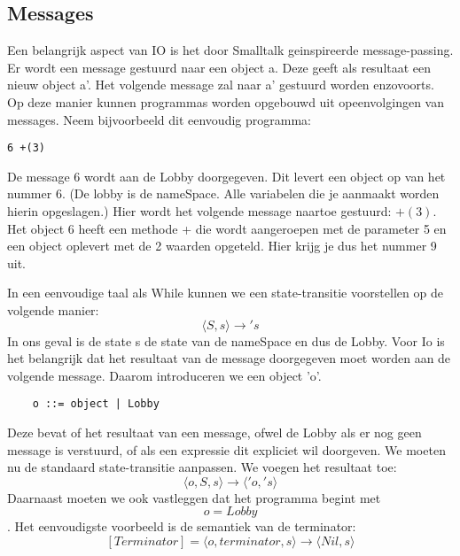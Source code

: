 \documentclass[12pt]{article}
\begin{document}
\subsection{Messages}
Een belangrijk aspect van IO is het door Smalltalk geinspireerde message-passing. Er wordt een message gestuurd naar een object a. Deze geeft als resultaat een nieuw object a'. Het volgende message zal naar a' gestuurd worden enzovoorts.  Op deze manier kunnen programmas worden opgebouwd uit opeenvolgingen van messages. Neem bijvoorbeeld dit eenvoudig programma:
\begin{lstlisting}[frame=single]
6 +(3)
\end{lstlisting}
De message 6 wordt aan de Lobby doorgegeven. Dit levert een object op van het nummer $6$. (De lobby is de nameSpace. Alle variabelen die je aanmaakt worden hierin opgeslagen.) Hier wordt het volgende message naartoe gestuurd: $+(3)$. Het object 6 heeft een methode + die wordt aangeroepen met de parameter 5 en een object oplevert met de 2 waarden opgeteld. Hier krijg je dus het nummer 9 uit.  


In een eenvoudige taal als While kunnen we een state-transitie voorstellen op de volgende manier:
\[\langle S,s \rangle \rightarrow \prime s\]
In ons geval is de state s de state van de nameSpace en dus de Lobby.
Voor Io is het belangrijk dat het resultaat van de message doorgegeven moet worden aan de volgende message. Daarom introduceren we een object 'o'.
\begin{lstlisting}
	o ::= object | Lobby
\end{lstlisting}
Deze bevat of het resultaat van een message, ofwel de Lobby als er nog geen message is verstuurd, of als een expressie dit expliciet wil doorgeven. We moeten nu de standaard state-transitie aanpassen. We voegen het resultaat toe:
\[\langle o,S,s \rangle \rightarrow \langle \prime o,\prime s \rangle\]
Daarnaast moeten we ook vastleggen dat het programma begint met \[o = Lobby\]. Het eenvoudigste voorbeeld is de semantiek van de terminator:
\[[Terminator] = \langle o, terminator, s\rangle \rightarrow \langle Nil, s\rangle\]
\end{document}
